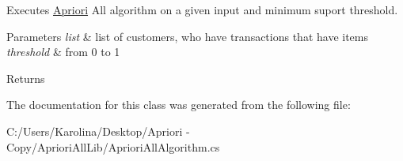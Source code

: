 Executes \hyperlink{class_apriori_all_lib_1_1_apriori}{Apriori} All algorithm on a given input and minimum suport threshold. 


\begin{DoxyParams}{Parameters}
{\em list} & list of customers, who have transactions that have items\\
\hline
{\em threshold} & from 0 to 1\\
\hline
\end{DoxyParams}
\begin{DoxyReturn}{Returns}

\end{DoxyReturn}


The documentation for this class was generated from the following file\-:\begin{DoxyCompactItemize}
\item 
C\-:/\-Users/\-Karolina/\-Desktop/\-Apriori -\/ Copy/\-Apriori\-All\-Lib/Apriori\-All\-Algorithm.\-cs\end{DoxyCompactItemize}
